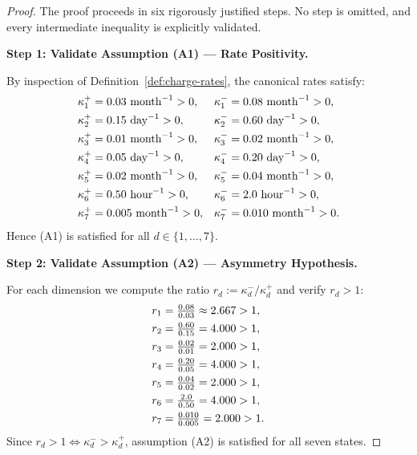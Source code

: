 \documentclass[12pt,openany]{book}
\numberwithin{equation}{chapter}
\theoremstyle{plain}
\theoremstyle{definition}
\theoremstyle{remark}
\begin{document}
\begin{proof}
The proof proceeds in six rigorously justified steps.  No step
is omitted, and every intermediate inequality is explicitly
validated.

\medskip
\noindent\textbf{Step 1: Validate Assumption (A1) --- Rate
Positivity.}

\noindent
By inspection of Definition~\ref{def:charge-rates}, the
canonical rates satisfy:
\begin{align}
  \kappa_1^{+} &= 0.03\ \text{month}^{-1} > 0, &
  \kappa_1^{-} &= 0.08\ \text{month}^{-1} > 0, \notag \\
  \kappa_2^{+} &= 0.15\ \text{day}^{-1} > 0, &
  \kappa_2^{-} &= 0.60\ \text{day}^{-1} > 0, \notag \\
  \kappa_3^{+} &= 0.01\ \text{month}^{-1} > 0, &
  \kappa_3^{-} &= 0.02\ \text{month}^{-1} > 0, \notag \\
  \kappa_4^{+} &= 0.05\ \text{day}^{-1} > 0, &
  \kappa_4^{-} &= 0.20\ \text{day}^{-1} > 0, \notag \\
  \kappa_5^{+} &= 0.02\ \text{month}^{-1} > 0, &
  \kappa_5^{-} &= 0.04\ \text{month}^{-1} > 0, \notag \\
  \kappa_6^{+} &= 0.50\ \text{hour}^{-1} > 0, &
  \kappa_6^{-} &= 2.0\ \text{hour}^{-1} > 0, \notag \\
  \kappa_7^{+} &= 0.005\ \text{month}^{-1} > 0, &
  \kappa_7^{-} &= 0.010\ \text{month}^{-1} > 0.
  \label{eq:rate-positivity}
\end{align}
Hence (A1) is satisfied for all $d \in \{1,\ldots,7\}$. \checkmark

\medskip
\noindent\textbf{Step 2: Validate Assumption (A2) --- Asymmetry
Hypothesis.}

\noindent
For each dimension we compute the ratio
$r_d := \kappa_d^{-} / \kappa_d^{+}$ and verify $r_d > 1$:
\begin{align}
  r_1 &= \tfrac{0.08}{0.03} \approx 2.667 > 1, \notag \\
  r_2 &= \tfrac{0.60}{0.15} = 4.000 > 1, \notag \\
  r_3 &= \tfrac{0.02}{0.01} = 2.000 > 1, \notag \\
  r_4 &= \tfrac{0.20}{0.05} = 4.000 > 1, \notag \\
  r_5 &= \tfrac{0.04}{0.02} = 2.000 > 1, \notag \\
  r_6 &= \tfrac{2.0}{0.50} = 4.000 > 1, \notag \\
  r_7 &= \tfrac{0.010}{0.005} = 2.000 > 1.
  \label{eq:asymmetry-check}
\end{align}
Since $r_d > 1 \Leftrightarrow \kappa_d^{-} > \kappa_d^{+}$,
assumption (A2) is satisfied for all seven states. \checkmark


\end{proof}
\end{document}

